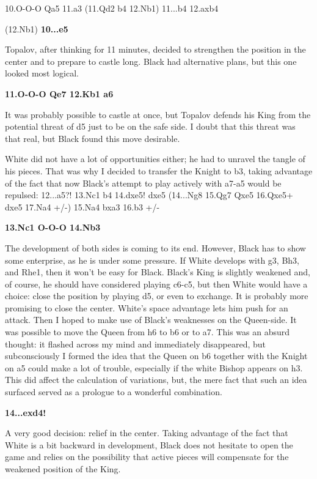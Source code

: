 \documentclass[
	11pt,twocolumn]{article}
\renewcommand{\bf}{\bfseries}
\begin{document}
10.O-O-O Qa5 11.a3 (11.Qd2 b4 12.Nb1) 11...b4 12.axb4

(12.Nb1) {\bf 10...e5 }

Topalov, after thinking for 11 minutes, decided to strengthen the position in the center and to prepare to castle long. Black had alternative plans, but this one looked most logical.

{\bf 11.O-O-O Qe7 12.Kb1 a6 }

It was probably possible to castle at once, but Topalov defends his King from the potential threat of d5 just to be on the safe side. I doubt that this threat was that real, but Black found this move desirable.



White did not have a lot of opportunities either; he had to unravel the tangle of his pieces. That was why I decided to transfer the Knight to b3, taking advantage of the fact that now Black's attempt to play actively with a7-a5 would be repulsed: 12...a5?! 13.Nc1 b4 14.dxe5! dxe5 (14...Ng8 15.Qg7 Qxe5 16.Qxe5+ dxe5 17.Na4 +/-) 15.Na4 bxa3 16.b3 +/-

{\bf 13.Nc1 O-O-O 14.Nb3 }

The development of both sides is coming to its end. However, Black has to show some enterprise, as he is under some pressure. If White develops with g3, Bh3, and Rhe1, then it won't be easy for Black. Black's King is slightly weakened and, of course, he should have considered playing c6-c5, but then White would have a choice: close the position by playing d5, or even to exchange. It is probably more promising to close the center. White's space advantage lets him push for an attack. Then I hoped to make use of Black's weaknesses on the Queen-side. It was possible to move the Queen from h6 to b6 or to a7. This was an absurd thought: it flashed across my mind and immediately disappeared, but subconsciously I formed the idea that the Queen on b6 together with the Knight on a5 could make a lot of trouble, especially if the white Bishop appears on h3. This did affect the calculation of variations, but, the mere fact that such an idea surfaced served as a prologue to a wonderful combination.

{\bf 14...exd4! }

A very good decision: relief in the center. Taking advantage of the fact that White is a bit backward in development, Black does not hesitate to open the game and relies on the possibility that active pieces will compensate for the weakened position of the King.
\end{document}
